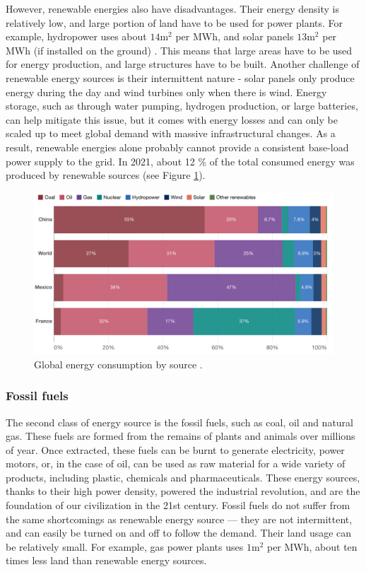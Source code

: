 \documentclass[my_thesis.tex]{subfiles}
\begin{document}
However, renewable energies also have disadvantages. Their energy density is relatively low, and large portion of land have to be used for power plants. For example, hydropower uses about $14\text{m}^2$ per MWh, and solar panels $13\text{m}^2$ per MWh (if installed on the ground) \citep{ritchieHowDoesLand2022}. This means that large areas have to be used for energy production, and large structures have to be built. Another challenge of renewable energy sources is their intermittent nature - solar panels only produce energy during the day and wind turbines only when there is wind. Energy storage, such as through water pumping, hydrogen production, or large batteries, can help mitigate this issue, but it comes with energy losses and can only be scaled up to meet global demand with massive infrastructural changes. As a result, renewable energies alone probably cannot provide a consistent base-load power supply to the grid. In 2021, about 12 \% of the total consumed energy was produced by renewable sources (see Figure \ref{fig.energy consumption}).

\begin{figure}
    \centering
    \includegraphics[width=\linewidth]{images/primary-energy-source-bar.png}
    \caption{Global energy consumption by source \citep{ritchieWhichSourcesDoes2021}.}
    \label{fig.energy consumption}
\end{figure}

\subsubsection{Fossil fuels}
The second class of energy source is the fossil fuels, such as coal, oil and natural gas. These fuels are formed from the remains of plants and animals over millions of year. Once extracted, these fuels can be burnt to generate electricity, power motors, or, in the case of oil, can be used as raw material for a wide variety of products, including plastic, chemicals and pharmaceuticals. These energy sources, thanks to their high power density, powered the industrial revolution, and are the foundation of our civilization in the 21st century. Fossil fuels do not suffer from the same shortcomings as renewable energy source --- they are not intermittent, and can easily be turned on and off to follow the demand. Their land usage can be relatively small. For example, gas power plants uses $1\text{m}^2$ per MWh, about ten times less land than renewable energy sources. 
\end{document}
